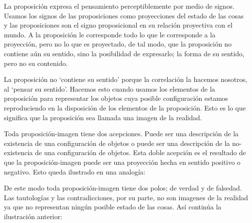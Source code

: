     La proposición expresa el pensamiento perceptiblemente por medio de signos.
    Usamos los signos de las proposiciones como proyecciones del estado de las cosas
    y las proposiciones son el signo proposicional en su relación proyectiva con el
    mundo. A la proposición le corresponde todo lo que le corresponde a la
    proyección, pero no lo que es proyectado, de tal modo, que la proposición no
    contiene aún su sentido, sino la posibilidad de expresarlo; la forma de su
    sentido, pero no su contenido.\autocite[cf.~][3.1,3.11-3.13]{tractatus} 

    La proposición no `contiene su sentido' porque la correlación la hacemos nosotros,
    al `pensar su sentido'. Hacemos esto cuando usamos los elementos de la
    proposición para representar los objetos cuya posible configuración estamos 
    reproduciendo en la disposición de los elementos de la proposición. Esto es lo
    que significa que la proposición sea llamada una imagen de la
    realidad.\autocite[cf.~][p.69]{IWT}  

    Toda proposición-imagen tiene dos acepciones. Puede ser una descripción de
    la existencia de una configuración de objetos o puede ser una descripción de la
    no-existencia de una configuración de objetos.\autocite[cf.~][p.~72]{IWT} 
    Esta doble acepción es el resultado de que la proposición-imagen puede ser una
    proyección hecha en sentido positivo o negativo.\autocite[cf.~][p.~74]{IWT} Esto
    queda ilustrado en una analogía:


    De este modo toda proposición-imagen tiene dos polos; de verdad y de falsedad.
    Las tautologías y las contradicciones, por su parte, no son imagenes de la
    realidad ya que no representan ningún posible estado de las cosas. Así continúa
    la ilustración anterior:

